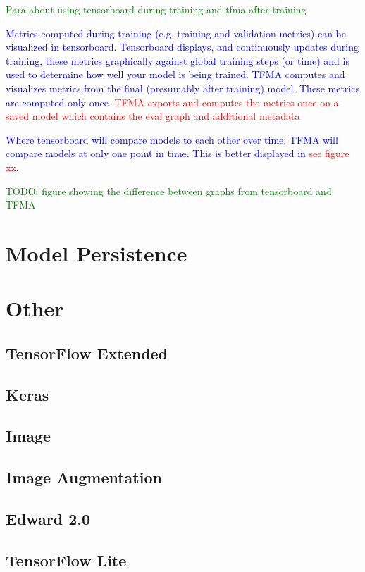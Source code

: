 \textcolor{green}{Para about using tensorboard during training and tfma after training}

\textcolor{blue}{Metrics computed during training (e.g. training and validation metrics) can be visualized in tensorboard. Tensorboard displays, and continuously updates during training, these metrics graphically against global training steps (or time) and is used to determine how well your model is being trained. TFMA computes and visualizes metrics from the final (presumably after training) model. These metrics are computed only once. \textcolor{red}{TFMA exports and computes the metrics once on a saved model which contains the eval graph and additional metadata}}

\textcolor{blue}{Where tensorboard will compare models to each other over time, TFMA will compare models at only one point in time. This is better displayed in \textcolor{red}{see figure xx}.}

\textcolor{green}{TODO: figure showing the difference between graphs from tensorboard and TFMA}








\section{Model Persistence}









\section{Other}



\subsection{TensorFlow Extended}

\subsection{Keras}

\subsection{Image}

\subsection{Image Augmentation}

\subsection{Edward 2.0}

\subsection{TensorFlow Lite}
